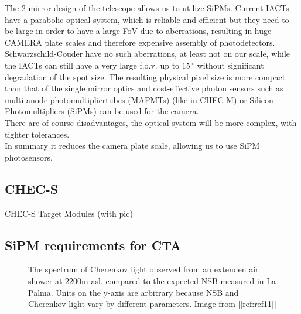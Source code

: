 \documentclass[12pt,article,type=msc,colorback,accentcolor=tud9c]{tudthesis}
\begin{document}
\begin{figure}[t]
\begin{centering}
}
\caption{Schwarzschild-Couder Optics, If possible replace picture with GCT with mounted CHEC camera picture here}
\label{fig:SCO}
\end{centering}
\end{figure}


The 2 mirror design of the telescope allows us to utilize SiPMs. Current IACTs have a parabolic optical system, which is reliable and efficient but they need to be large in order to have a large FoV due to aberrations, resulting in huge CAMERA plate scales and therefore expensive assembly of photodetectors.\\

Schwarzschild-Couder have no such aberrations, at least not on our scale, while the IACTs can still have a very large f.o.v. up to $15\,^{\circ}$ without significant degradation of the spot size. The resulting physical pixel size is more compact than that of the single mirror optics and cost-effective  photon sensors such as multi-anode photomultipliertubes (MAPMTs) (like in CHEC-M) or Silicon Photomultipliers (SiPMs) can be used for the camera.\\
There are of course disadvantages, the optical system will be more complex, with tighter tolerances.\\

In summary it reduces the camera plate scale, allowing us to use SiPM photosensors.

\subsection{CHEC-S}
CHEC-S
Target Modules (with pic)

\subsection{SiPM requirements for CTA}
\begin{figure}[t]
\begin{centering}
\caption{The spectrum of Cherenkov light observed from an extenden air shower at 2200m asl. compared to the expected NSB measured in La Palma. Units on the y-axis are arbitrary because NSB and Cherenkov light vary by different parameters. Image from [\ref{ref:ref11}]}
\label{fig:Cherenkov_NSB}
\end{centering}
\end{figure}
\end{document}
